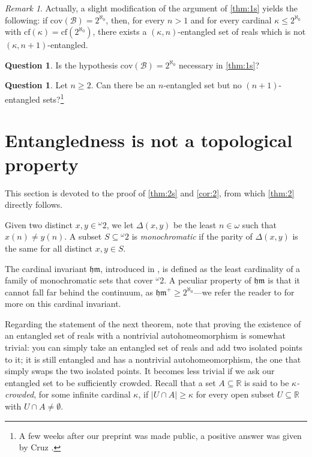\documentclass[12pt]{amsart}
\theoremstyle{definition}
\newtheorem{question}[theorem]{Question}
\theoremstyle{remark}
\newtheorem{remark}[theorem]{Remark}
\begin{document}
\begin{remark}
Actually, a slight modification of the argument of \cref{thm:1s} yields the following: if $\mathrm{cov}(\mathcal{B}) = 2^{\aleph_0}$, then, for every $n > 1$ and for every cardinal $\kappa \le 2^{\aleph_0}$ with $\mathrm{cf}(\kappa) = \mathrm{cf}(2^{\aleph_0})$, there exists a $(\kappa, n)$-entangled set of reals which is not $(\kappa, n+1)$-entangled.
\end{remark}


\begin{question}
Is the hypothesis $\mathrm{cov}(\mathcal{B}) = 2^{\aleph_0}$ necessary in \cref{thm:1s}?
\end{question}

\begin{question}
Let $n\geq2$. Can there be an $n$-entangled set but no $(n+1)$-entangled sets?\footnote{A few weeks after our preprint was made public, a positive answer was given by Cruz \cite{chapital2025nentangledsetn1entangledsets}.}
\end{question}

\section{Entangledness is not a topological property}\label{sec:thm2}

This section is devoted to the proof of \cref{thm:2s} and \cref{cor:2}, from which \cref{thm:2} directly follows.

Given two distinct $x, y \in {}^\omega 2$, we let $\Delta(x,y)$ be the least $n\in\omega$ such that $x(n) \neq y(n)$. A subset $S\subseteq {}^\omega 2$ is \emph{monochromatic} if the parity of $\Delta(x,y)$ is the same for all distinct $x,y \in S$.

The cardinal invariant $\mathfrak{hm}$, introduced in \cite{MR1942314}, is defined as the least cardinality of a family of monochromatic sets that cover ${}^\omega 2$. A peculiar property of $\mathfrak{hm}$ is that it cannot fall far behind the continuum, as $\mathfrak{hm}^+ \ge 2^{\aleph_0}$---we refer the reader to \cite{MR2114964,MR4562119} for more on this cardinal invariant. 

Regarding the statement of the next theorem, note that proving the existence of an entangled set of reals with a nontrivial autohomeomorphism is somewhat trivial: you can simply take an entangled set of reals and add two isolated points to it; it is still entangled and has a nontrivial autohomeomorphism, the one that simply swaps the two isolated points. It becomes less trivial if we ask our entangled set to be sufficiently crowded. Recall that a set $A \subseteq \mathbb{R}$ is said to be \emph{$\kappa$-crowded}, for some infinite cardinal $\kappa$, if $|U \cap A| \ge \kappa$ for every open subset $U \subseteq \mathbb{R}$ with $U \cap A \neq \emptyset$.
\end{document}
